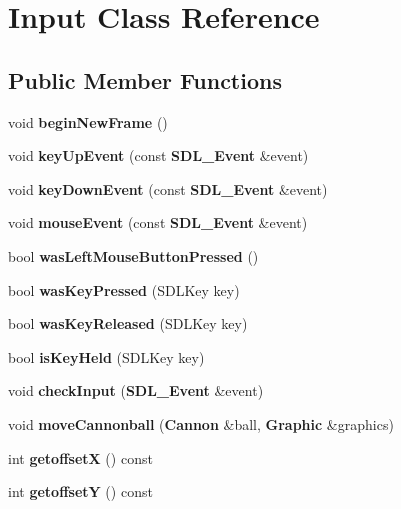 \section{Input Class Reference}
\label{class_input}
\subsection*{Public Member Functions}
\begin{DoxyCompactItemize}
\item 
void {\bfseries begin\+New\+Frame} ()\label{class_input_ac82c7c0bdc0b672b8d1354303ad09235}

\item 
void {\bfseries key\+Up\+Event} (const {\bf S\+D\+L\+\_\+\+Event} \&event)\label{class_input_af7975123c8e7bf107d3ffeb7e8c7ac62}

\item 
void {\bfseries key\+Down\+Event} (const {\bf S\+D\+L\+\_\+\+Event} \&event)\label{class_input_a2bcc16ac90c1001921978e6a2c470242}

\item 
void {\bfseries mouse\+Event} (const {\bf S\+D\+L\+\_\+\+Event} \&event)\label{class_input_a33758e5fc972c30d2effca8c45af2a3d}

\item 
bool {\bfseries was\+Left\+Mouse\+Button\+Pressed} ()\label{class_input_a0dad9a60338030fae228726f7d76bfe1}

\item 
bool {\bfseries was\+Key\+Pressed} (S\+D\+L\+Key key)\label{class_input_a20a05eafeefe8f0a4a901d8c23c862e6}

\item 
bool {\bfseries was\+Key\+Released} (S\+D\+L\+Key key)\label{class_input_a40f4e0bef7deaf1b81c517c8d2e4e08c}

\item 
bool {\bfseries is\+Key\+Held} (S\+D\+L\+Key key)\label{class_input_af69e24c9d691c43f56a4afc20d56a081}

\item 
void {\bfseries check\+Input} ({\bf S\+D\+L\+\_\+\+Event} \&event)\label{class_input_a6ea35796697b6be39118d7d51e8a47a5}

\item 
void {\bfseries move\+Cannonball} ({\bf Cannon} \&ball, {\bf Graphic} \&graphics)\label{class_input_a021cb5427da09e513b4ac4ed60f7b178}

\item 
int {\bfseries getoffset\+X} () const \label{class_input_a3f79c2144849f550f9102856d46d3d59}

\item 
int {\bfseries getoffset\+Y} () const \label{class_input_a76e210586ca26895c80af7268475187f}

\end{DoxyCompactItemize}
